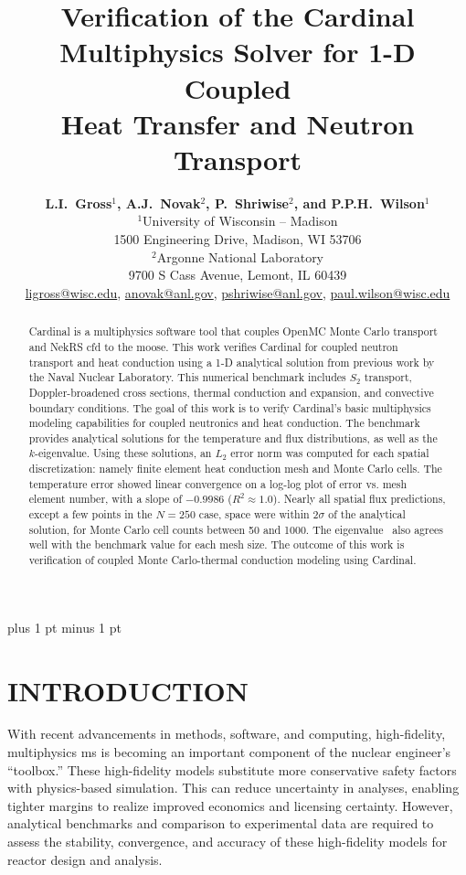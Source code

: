 \documentclass[letterpaper]{mc2023}
\title{Verification of the Cardinal Multiphysics Solver for 1-D Coupled\\
Heat Transfer and Neutron Transport}
\author{%
  \textbf{L.I.~Gross$^1$, A.J.~Novak$^2$, P.~Shriwise$^2$, and P.P.H.~Wilson$^1$}\\
  $^1$University of Wisconsin -- Madison  \\
  1500 Engineering Drive, Madison, WI 53706 \vspace{6pt}\\
  $^2$Argonne National Laboratory \\
  9700 S Cass Avenue, Lemont, IL 60439\vspace{6pt} \\
  \url{ligross@wisc.edu}, \url{anovak@anl.gov}, \url{pshriwise@anl.gov}, \url{paul.wilson@wisc.edu}
}
\begin{document}
\maketitle
\justify
\parskip 6pt plus 1 pt minus 1 pt

\begin{abstract}
Cardinal is a multiphysics software tool that couples OpenMC Monte Carlo transport and NekRS \gls{cfd} to the \gls{moose}. This
work verifies Cardinal for coupled neutron transport and heat conduction using a 1-D analytical solution from previous work by the
Naval Nuclear Laboratory. This numerical benchmark includes $S_2$ transport, Doppler-broadened cross sections, thermal conduction
and expansion, and convective boundary conditions. The goal of this work is to verify Cardinal's basic multiphysics modeling
capabilities for coupled neutronics and heat conduction. The benchmark provides analytical solutions for the temperature and flux
distributions, as well as the $k$-eigenvalue. Using these solutions, an $L_{2}$ error norm was computed for each spatial discretization:
namely finite element heat conduction mesh and Monte Carlo cells. The temperature error showed linear convergence on a log-log plot of
error vs. mesh element number, with a slope of $-0.9986$ ($R^2\approx 1.0$). Nearly all spatial flux predictions, except a few points
in the $N=250$ case, space were within $2\sigma$ of the analytical solution, for Monte Carlo cell counts between 50 and 1000. The
eigenvalue \keff~also agrees well with the benchmark value for each mesh size. The outcome of this work is verification of coupled
Monte Carlo-thermal conduction modeling using Cardinal.
\end{abstract}
\vspace{6pt}

\section{INTRODUCTION}
\label{sec:intro}
With recent advancements in methods, software, and computing, high-fidelity, multiphysics \gls{ms} is becoming an important
component of the nuclear engineer's ``toolbox.'' These high-fidelity models substitute more conservative safety factors
with physics-based simulation. This can reduce uncertainty in analyses, enabling tighter margins to realize improved economics
and licensing certainty. However, analytical benchmarks and comparison to experimental data are required to assess the stability,
convergence, and accuracy of these high-fidelity models for reactor design and analysis.
\end{document}
